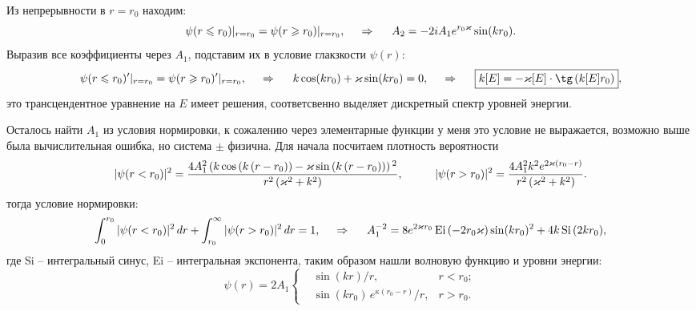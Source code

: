 Из непрерывности в $r=r_0$ находим:
\begin{equation*}
    \psi(r \leq r_0) |_{r=r_0} = 
    \psi(r \geq r_0) |_{r=r_0},
    \hspace{0.5cm} \Rightarrow \hspace{0.5cm}
    A_2 = - 2 i A_1 e^{r_0 \kappa} \sin(k r_0).
\end{equation*}
Выразив все коэффициенты через $A_1$, подставим их в условие глакзкости $\psi(r)$:
\begin{equation*}
    \psi(r \leq r_0)' |_{r=r_0} = 
    \psi(r \geq r_0)' |_{r=r_0},
    \hspace{0.5cm} \Rightarrow \hspace{0.5cm}
    k \cos(k r_0) + \kappa \sin(k r_0) = 0,
    \hspace{0.5cm} \Rightarrow \hspace{0.5cm}
    \boxed{k[E] = - \kappa[E] \cdot \tg\left(k[E] r_0\right)},
\end{equation*}
это трансцендентное уравнение на $E$ имеет решения, соответсвенно выделяет дискретный спектр уровней энергии. 

Осталось найти $A_1$ из условия нормировки, к сожалению через элементарные функции у меня это условие не выражается, возможно выше была вычислительная ошибка, но система $\pm$ физична. Для начала посчитаем плотность вероятности
\begin{equation*}
    |\psi(r < r_0)|^2 = 
    \frac{4 A_1^2 \left(k \cos \left(k \left(r-r_0\right)\right)-\kappa  \sin \left(k \left(r-r_0\right)\right)\right){}^2}{r^2 \left(\kappa ^2+k^2\right)}
    , \hspace{10 mm} 
    |\psi(r > r_0)|^2 = \frac{4 A_1^2 k^2 e^{2 \kappa  \left(r_0-r\right)}}{r^2 \left(\kappa ^2+k^2\right)}.
\end{equation*}
тогда условие нормировки:
\begin{equation*}
    \int_0^{r_0} |\psi(r<r_0)|^2 \d r + 
    \int_{r_0}^{\infty} |\psi(r>r_0)|^2 \d r  = 1,
    \hspace{0.5cm} \Rightarrow \hspace{0.5cm}
    A_1^{-2} = 8 e^{2 \kappa r_0} \, \text{Ei}\,(-2 r_0 \kappa) \sin(k r_0)^2 + 
    4 k \, \text{Si}\, (2 k r_0),
\end{equation*}
где Si -- интегральный синус, Ei -- интегральная экспонента, таким образом нашли волновую функцию и уровни энергии:
\begin{equation*}
    \psi(r) = 2 A_1 \left\{\begin{aligned}
        &\sin(k r)/r, &r<r_0; \\
        &\sin(k r_0) \,  e^{\kappa(r_0-  r)}/r ,  
        &r>r_0.
    \end{aligned}\right.
\end{equation*}








